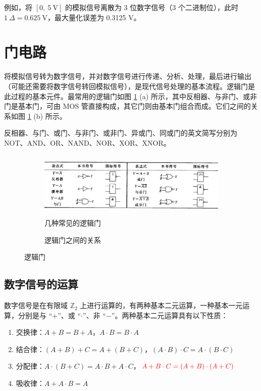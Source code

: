 \documentclass[UTF8]{report}
\def\Z{\mathbb{Z}}
\theoremstyle{MyLineTheoremStyle} %
\theoremstyle{MyBlockTheoremStyle} %
\theoremstyle{MySubsubsectionStyle} %
\begin{document}
例如，将 $[0,\ 5\ \mathrm{V}]$ 的模拟信号离散为 3 位数字信号（3 个二进制位），此时 $1\  \Delta = 0.625\ \mathrm{V}$，最大量化误差为 0.3125 V。


\section{门电路}

将模拟信号转为数字信号，并对数字信号进行传递、分析、处理，最后进行输出（可能还需要将数字信号转回模拟信号），是现代信号处理的基本流程。逻辑门是此过程的基本元件。最常用的逻辑门如图 \ref{逻辑门} (a) 所示，其中反相器、与非门、或非门是基本门，可由 MOS 管直接构成，其它门则由基本门组合而成。它们之间的关系如图 \ref{逻辑门} (b) 所示。


反相器、与门、或门、与非门、或非门、异或门、同或门的英文简写分别为 NOT、AND、OR、NAND、NOR、XOR、XNOR。

\begin{figure}[H]\centering
\begin{subfigure}[t]{0.7\columnwidth}\centering
    \includegraphics[height=90pt]{assets/2/逻辑门.png}
    \caption{ 几种常见的逻辑门 }
\end{subfigure}\hfill
\begin{subfigure}[t]{0.3\columnwidth}\centering
    
    \caption{ 逻辑门之间的关系 }
\end{subfigure}
\caption{ 逻辑门 }\label{逻辑门}
\end{figure}

\subsection{数字信号的运算}

数字信号是在有限域 $\Z_2$ 上进行运算的，有两种基本二元运算，一种基本一元运算，分别是与 “$+$”、或 “$\cdot$”、非 “$-$”。两种基本二元运算具有以下性质：

\begin{enumerate}
\item 交换律：$A + B = B + A$，$A \cdot B = B \cdot A$
\item 结合律：$(A + B) + C = A + (B + C)$，$(A \cdot B) \cdot C = A \cdot (B \cdot C)$
\item 分配律：$A \cdot (B + C) = A \cdot B + A \cdot C$，${\color{red} A + B \cdot C = (A + B) \cdot (A + C)}$
\item 吸收律：$A + A \cdot B = A$
\end{enumerate}
\end{document}
